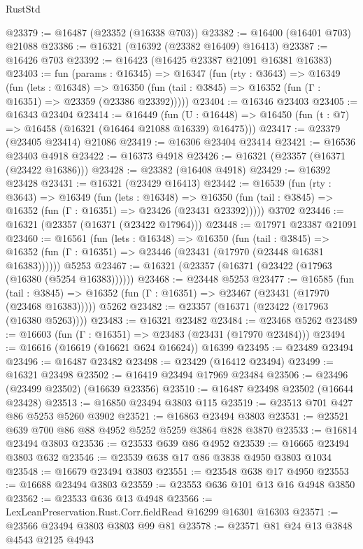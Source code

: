 \begin{lexlean}{RustStd}
\begin{coremodule}
@23379 := @16487 (@23352 (@16338 @703))
@23382 := @16400 (@16401 @703) @21088
@23386 := @16321 (@16392 (@23382 @16409) @16413)
@23387 := @16426 @703
@23392 := @16423 (@16425 @23387 @21091 @16381 @16383)
@23403 := fun (params : @16345) =>
  @16347
    (fun (rty : @3643) =>
    @16349
      (fun (lets : @16348) =>
      @16350 (fun (tail : @3845) => @16352 (fun (Γ : @16351) => @23359 (@23386 @23392)))))
@23404 := @16346 @23403
@23405 := @16343 @23404
@23414 := @16449
    (fun (U : @16448) => @16450 (fun (t : @7) => @16458 (@16321 (@16464 @21088 @16339) @16475)))
@23417 := @23379 (@23405 @23414) @21086
@23419 := @16306 @23404 @23414
@23421 := @16536 @23403 @4918
@23422 := @16373 @4918
@23426 := @16321 (@23357 (@16371 (@23422 @16386)))
@23428 := @23382 (@16408 @4918)
@23429 := @16392 @23428
@23431 := @16321 (@23429 @16413)
@23442 := @16539
    (fun (rty : @3643) =>
    @16349
      (fun (lets : @16348) =>
      @16350 (fun (tail : @3845) => @16352 (fun (Γ : @16351) => @23426 (@23431 @23392)))))
    @3702
@23446 := @16321 (@23357 (@16371 (@23422 @17964)))
@23448 := @17971 @23387 @21091
@23460 := @16561
    (fun (lets : @16348) =>
    @16350
      (fun (tail : @3845) =>
      @16352 (fun (Γ : @16351) => @23446 (@23431 (@17970 (@23448 @16381 @16383))))))
    @5253
@23467 := @16321 (@23357 (@16371 (@23422 (@17963 (@16380 (@5254 @16383))))))
@23468 := @23448 @5253
@23477 := @16585
    (fun (tail : @3845) => @16352 (fun (Γ : @16351) => @23467 (@23431 (@17970 (@23468 @16383)))))
    @5262
@23482 := @23357 (@16371 (@23422 (@17963 (@16380 @5263))))
@23483 := @16321 @23482
@23484 := @23468 @5262
@23489 := @16603 (fun (Γ : @16351) => @23483 (@23431 (@17970 @23484)))
@23494 := @16616 (@16619 (@16621 @624 @16624)) @16399
@23495 := @23489 @23494
@23496 := @16487 @23482
@23498 := @23429 (@16412 @23494)
@23499 := @16321 @23498
@23502 := @16419 @23494 @17969 @23484
@23506 := @23496 (@23499 @23502) (@16639 @23356)
@23510 := @16487 @23498 @23502 (@16644 @23428)
@23513 := @16850 @23494 @3803 @115
@23519 := @23513 @701 @427 @86 @5253 @5260 @3902
@23521 := @16863 @23494 @3803
@23531 := @23521 @639 @700 @86 @88 @4952 @5252 @5259 @3864 @828 @3870
@23533 := @16814 @23494 @3803
@23536 := @23533 @639 @86 @4952
@23539 := @16665 @23494 @3803 @632
@23546 := @23539 @638 @17 @86 @3838 @4950 @3803 @1034
@23548 := @16679 @23494 @3803
@23551 := @23548 @638 @17 @4950
@23553 := @16688 @23494 @3803
@23559 := @23553 @636 @101 @13 @16 @4948 @3850
@23562 := @23533 @636 @13 @4948
@23566 := LexLeanPreservation.Rust.Corr.fieldRead @16299 @16301 @16303
@23571 := @23566 @23494 @3803 @3803 @99 @81
@23578 := @23571 @81 @24 @13 @3848 @4543 @2125 @4943

\end{coremodule}
\end{lexlean}
